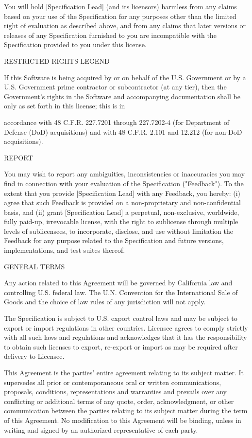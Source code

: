 \begin{flushleft}
You will hold [Specification Lead] (and its licensors) harmless from any claims based on your use of the Specification for any purposes other than the limited right of evaluation as described above, and from any claims that later versions or releases of any Specification furnished to you are incompatible with the Specification provided to you under this license.

RESTRICTED RIGHTS LEGEND

If this Software is being acquired by or on behalf of the U.S. Government or by a U.S. Government prime contractor or subcontractor (at any tier), then the Government's rights in the Software and accompanying documentation shall be only as set forth in this license; this is in

accordance with 48 C.F.R. 227.7201 through 227.7202-4 (for Department of Defense (DoD) acquisitions) and with 48 C.F.R. 2.101 and 12.212 (for non-DoD acquisitions).

REPORT

You may wish to report any ambiguities, inconsistencies or inaccuracies you may find in connection with your evaluation of the Specification ("Feedback"). To the extent that you provide [Specification Lead] with any Feedback, you hereby: (i) agree that such Feedback is provided on a non-proprietary and non-confidential basis, and (ii) grant [Specification Lead] a perpetual, non-exclusive, worldwide, fully paid-up, irrevocable license, with the right to sublicense through multiple levels of sublicensees, to incorporate, disclose, and use without limitation the Feedback for any purpose related to the Specification and future versions, implementations, and test suites thereof.

GENERAL TERMS

Any action related to this Agreement will be governed by California law and controlling U.S. federal law. The U.N. Convention for the International Sale of Goods and the choice of law rules of any jurisdiction will not apply.

The Specification is subject to U.S. export control laws and may be subject to export or import regulations in other countries. Licensee agrees to comply strictly with all such laws and regulations and acknowledges that it has the responsibility to obtain such licenses to export, re-export or import as may be required after delivery to Licensee.

This Agreement is the parties' entire agreement relating to its subject matter. It supersedes all prior or contemporaneous oral or written communications, proposals, conditions, representations and warranties and prevails over any conflicting or additional terms of any quote, order, acknowledgment, or other communication between the parties relating to its subject matter during the term of this Agreement. No modification to this Agreement will be binding, unless in writing and signed by an authorized representative of each party.


\end{flushleft}
